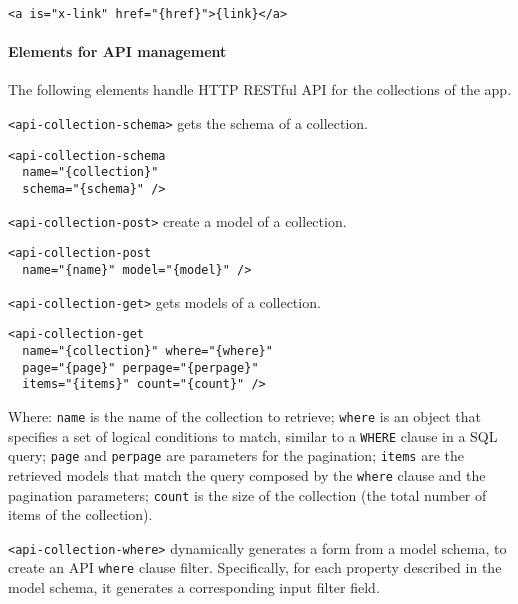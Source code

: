 \begin{lstlisting}[language=HTML5]
<a is="x-link" href="{href}">{link}</a>
\end{lstlisting}

\paragraph{Elements for API management}

The following elements handle HTTP RESTful API for the collections of the app.

\texttt{<api-collection-schema>} gets the schema of a collection. 

\begin{lstlisting}[language=HTML5]
<api-collection-schema 
  name="{collection}" 
  schema="{schema}" />
\end{lstlisting}

\vspace{0.2cm}

\texttt{<api-collection-post>} create a model of a collection. 

\begin{lstlisting}[language=HTML5]
<api-collection-post 
  name="{name}" model="{model}" />
\end{lstlisting}

\vspace{0.2cm}

\texttt{<api-collection-get>} gets models of a collection. 

\begin{lstlisting}[language=HTML5]
<api-collection-get 
  name="{collection}" where="{where}" 
  page="{page}" perpage="{perpage}"  
  items="{items}" count="{count}" />
\end{lstlisting}

Where: 
\texttt{name} is the name of the collection to retrieve; 
\texttt{where} is an object that specifies a set of logical conditions to match, similar to a \texttt{WHERE} clause in a SQL query;
\texttt{page} and \texttt{perpage} are parameters for the pagination;
\texttt{items} are the retrieved models that match the query composed by the \texttt{where} clause and the pagination parameters;
\texttt{count} is the size of the collection (the total number of items of the collection).

\vspace{0.2cm}

\texttt{<api-collection-where>} dynamically generates a form from a model schema, to create an API \texttt{where} clause filter. Specifically, for each property described in the model schema, it generates a corresponding input filter field. 

